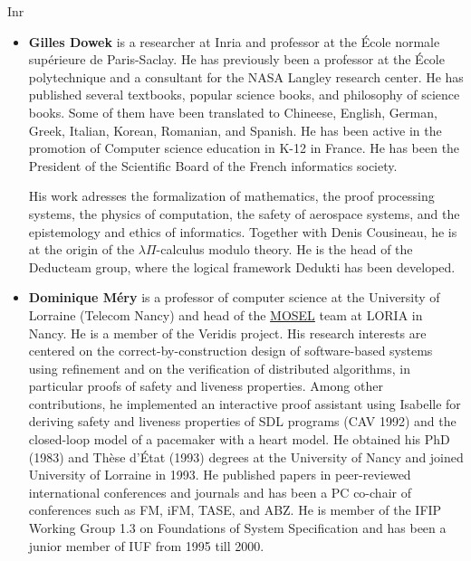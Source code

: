 \begin{sitedescription}{Inr}
\begin{itemize}
\item{\bf Gilles Dowek} is a researcher at Inria and professor at the École
normale supérieure de Paris-Saclay. He has previously been a professor
at the École polytechnique and a consultant for the NASA Langley
research center. He has published several textbooks, popular science
books, and philosophy of science books. Some of them have been
translated to Chineese, English, German, Greek, Italian, Korean,
Romanian, and Spanish. He has been active in the promotion of
Computer science education in K-12 in France. He has been the
President of the Scientific Board of the French informatics society.

His work adresses the formalization of mathematics, the proof
processing systems, the physics of computation, the safety of
aerospace systems, and the epistemology and ethics of informatics.
Together with Denis Cousineau, he is at the origin of the
$\lambda\Pi$-calculus modulo theory. He is the head of the Deducteam
group, where the logical framework Dedukti has been developed.


\item{\bf Dominique M\'ery}  is a professor of computer science at the
  University of Lorraine (Telecom Nancy)  and head of the
  \href{https://mosel.loria.fr}{MOSEL} team at LORIA in Nancy.
  He is a member of the Veridis project.
His research interests are centered on the   correct-by-construction
design  of software-based systems  using refinement and on the
verification   of distributed algorithms, in particular proofs of safety and liveness
properties. Among other contributions, he implemented an interactive
proof assistant using Isabelle  for deriving safety and liveness
properties of SDL programs (CAV 1992) and  the closed-loop model of
a pacemaker with a heart model.
He obtained his PhD (1983) and Thèse d'État (1993) degrees at the
University of Nancy and joined University of Lorraine in 1993. He published  papers
in peer-reviewed international conferences and journals and has been a PC co-chair
of conferences such as FM, iFM, TASE, and ABZ. He is member of the IFIP
Working Group 1.3 on Foundations of System Specification and has been a junior member of IUF from 1995 till 2000.


\end{itemize}
\end{sitedescription}

